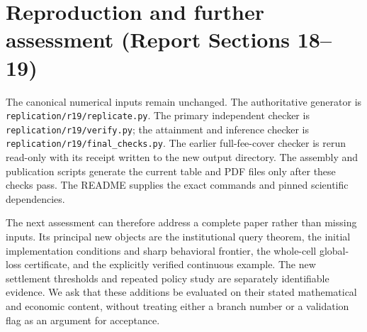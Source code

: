 \section{Reproduction and further assessment (Report Sections 18--19)}
The canonical numerical inputs remain unchanged. The authoritative generator is \texttt{replication/r19/replicate.py}. The primary independent checker is \texttt{replication/r19/verify.py}; the attainment and inference checker is \texttt{replication/r19/final\_checks.py}. The earlier full-fee-cover checker is rerun read-only with its receipt written to the new output directory. The assembly and publication scripts generate the current table and PDF files only after these checks pass. The README supplies the exact commands and pinned scientific dependencies.

The next assessment can therefore address a complete paper rather than missing inputs. Its principal new objects are the institutional query theorem, the initial implementation conditions and sharp behavioral frontier, the whole-cell global-loss certificate, and the explicitly verified continuous example. The new settlement thresholds and repeated policy study are separately identifiable evidence. We ask that these additions be evaluated on their stated mathematical and economic content, without treating either a branch number or a validation flag as an argument for acceptance.

